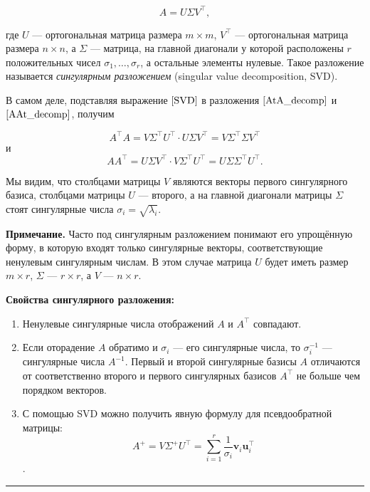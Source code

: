 \documentclass[11pt,a4paper]{article}
\renewcommand{\linethickness}{0.1ex}
\providecommand{\tightlist}{%
      \setlength{\itemsep}{0pt}\setlength{\parskip}{0pt}}
\begin{document}
\[ A = U \Sigma V^\top, \tag{3}\label{SVD} \]

где \(U\) --- ортогональная матрица размера \(m \times m\), \(V^\top\)
--- ортогональная матрица размера \(n \times n\), а \(\Sigma\) ---
матрица, на главной диагонали у которой расположены \(r\) положительных
чисел \(\sigma_1, \ldots, \sigma_r\), а остальные элементы нулевые.
Такое разложение называется \emph{сингулярным разложением} (singular
value decomposition, SVD).

В самом деле, подставляя выражение \(\eqref{SVD}\) в разложения
\(\eqref{AtA_decomp}\) и \(\eqref{AAt_decomp}\), получим

\[ A^\top A = V \Sigma^\top U^\top \cdot U \Sigma V^\top = V \Sigma^\top \Sigma V^\top \]
и
\[ A A^\top = U \Sigma V^\top \cdot V \Sigma^\top U^\top = U \Sigma \Sigma^\top U^\top. \]

Мы видим, что столбцами матрицы \(V\) являются векторы первого
сингулярного базиса, столбцами матрицы \(U\) --- второго, а на главной
диагонали матрицы \(\Sigma\) стоят сингулярные числа
\(\sigma_i = \sqrt{\lambda_i}\).

\textbf{Примечание.} Часто под сингулярным разложением понимают его
упрощённую форму, в которую входят только сингулярные векторы,
соответствующие ненулевым сингулярным числам. В этом случае матрица
\(U\) будет иметь размер \(m \times r\), \(\Sigma\) --- \(r \times r\),
а \(V\) --- \(n \times r\).

    \textbf{Свойства сингулярного разложения:}

\begin{enumerate}
\def\labelenumi{\arabic{enumi}.}
\tightlist
\item
  Ненулевые сингулярные числа отображений \(A\) и \(A^\top\) совпадают.
\item
  Если оторадение \(A\) обратимо и \(\sigma_i\) --- его сингулярные
  числа, то \(\sigma_i^{-1}\) --- сингулярные числа \(A^{-1}\). Первый и
  второй сингулярные базисы \(A\) отличаются от соответственно второго и
  первого сингулярных базисов \(A^\top\) не больше чем порядком
  векторов.
\item
  С помощью SVD можно получить явную формулу для псевдообратной матрицы:
  \[ A^{+} = V \Sigma^{+} U^\top = \sum_{i=1}^r \frac{1}{\sigma_i} \mathbf{v}_i \mathbf{u}_i^\top \].
\end{enumerate}

    \begin{center}\rule{0.5\linewidth}{\linethickness}\end{center}
\end{document}
